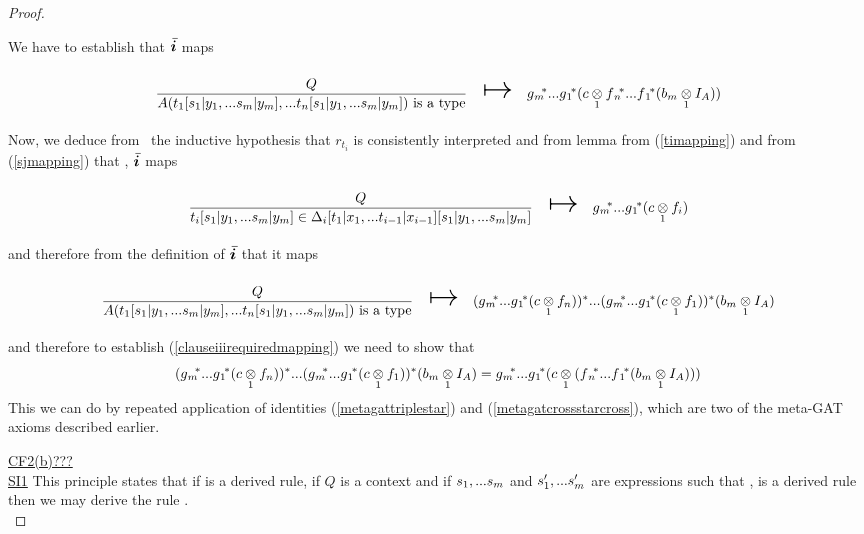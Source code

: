 \begin{proof}
\begin{newtt}
We have to establish that $\Ibar$ maps
\begin{equation}
\label{clauseiiirequiredmapping}
\begin{array}{c c c}
\forceSOURCEwidth & & \forceTARGETwidth \\ [-0.1cm]
\gatdisplayrule{Q}{\isT{A(t_1[\SUBsFORy{m}],...t_n[\SUBsFORy{m}])}}   & \Imapsto & \gmvectorstar (\crossx{c}{\fnvectorstar(\crossx{b_m}{I_A}{1})}{1}) \\ [0.4cm]
\end{array}
\end{equation}
Now, we deduce from \ the inductive hypothesis that $r_{t_i}$ is consistently interpreted and 
from lemma  from (\ref{timapping}) and from (\ref{sjmapping}) that \foreachi, $\Ibar$ maps
\begin{equation}
\begin{array}{c c c}
\forceSOURCEwidth & & \forceTARGETwidth \\ [-0.1cm]
\gatdisplayrule{Q}{\ofT{t_i[\SUBsFORy{m}]}{\Delta_i[t_1 | x_1,...t_{i-1}|x_{i-1}][\SUBsFORy{m}]}}  & \Imapsto & \gmvectorstar (\crossx{c}{f_i}{1}) \\ [0.4cm]
\end{array}
\end{equation}
and therefore from the definition of $\Ibar$ that it maps
\begin{equation*}
\begin{array}{c c c}
\forceSOURCEwidth & & \forceTARGETwidth \\ [-0.1cm]
\gatdisplayrule{Q}{\isT{A(t_1[\SUBsFORy{m}],...t_n[\SUBsFORy{m}])}}  & \Imapsto & \clausethreelhs \\ [0.4cm]
\end{array}
\end{equation*}
and therefore to establish (\ref{clauseiiirequiredmapping}) we need to show that
\begin{equation*}
(g{_m}\kern-.25em^*...g{_1}\kern-.15em^* (c \underset{1}{\otimes} f_n))^* ... (g{_m}\kern-.25em^*...g{_1}\kern-.15em^* (c \underset{1}{\otimes} f_1)) ^* (b_m \underset{1}{\otimes} I_A) = g{_m}\kern-.25em^*...g{_1}\kern-.15em^* ( c \underset{1}{\otimes} (f{_n}\kern-.2em^*...f{_1}\kern-.15em^*(b_m \underset{1}{\otimes} I_A)) )										
\end{equation*}
This we can do by repeated application of identities (\ref{metagattriplestar})
and (\ref{metagatcrossstarcross}), which are two of the meta-GAT axioms described earlier.\\
\end{newtt}

\underline{CF2(b)???} \\

\underline{SI1} 
This principle states that if  is a derived rule, if $Q$ is a context and if  $s_1,...s_{m}$ and $s'_1,...s'_{m}$ are expressions such that
\foreachj,  is a derived rule then we may derive the rule
. \\


\end{proof}
